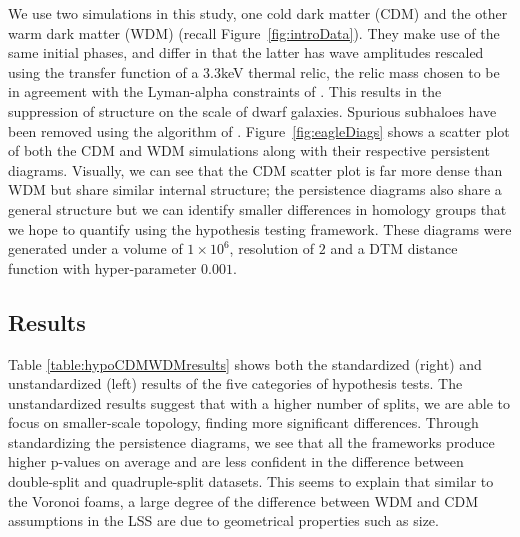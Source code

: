 \documentclass[12pt]{article}
\newcommand{\figref}[1]{Figure~\ref{#1}}
\begin{document}
We use two simulations in this study, one cold dark matter (CDM) and the other warm dark matter (WDM) (recall \figref{fig:introData}). They make use of the same initial phases, and differ in that the latter has wave amplitudes rescaled using the transfer function of a 3.3keV thermal relic, the relic mass chosen to be in agreement with the Lyman-alpha constraints of \cite{viel2013warm}. This results in the suppression of structure on the scale of dwarf galaxies. Spurious subhaloes have been removed using the algorithm of \cite{lovell2014properties}. \figref{fig:eagleDiags} shows a scatter plot of both the CDM and WDM simulations along with their respective persistent diagrams. Visually, we can see that the CDM scatter plot is far more dense than WDM but share similar internal structure; the persistence diagrams also share a general structure but we can identify smaller differences in homology groups that we hope to quantify using the hypothesis testing framework. These diagrams were generated under a volume of $1\times 10^{6}$, resolution of $2$ and a DTM distance function with hyper-parameter $0.001$. 

\subsection{Results}
Table \ref{table:hypoCDMWDMresults} shows both the standardized (right) and unstandardized (left) results of the five categories of hypothesis tests. The unstandardized results suggest that with a higher number of splits, we are able to focus on smaller-scale topology, finding more significant differences. Through standardizing the persistence diagrams, we see that all the frameworks produce higher p-values on average and are less confident in the difference between double-split and quadruple-split datasets. This seems to explain that similar to the Voronoi foams, a large degree of the difference between WDM and CDM assumptions in the LSS are due to geometrical properties such as size.  
\end{document}

